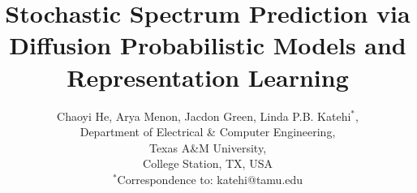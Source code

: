 \documentclass[lettersize,journal]{IEEEtran}
\begin{document}
\title{Stochastic Spectrum Prediction via Diffusion Probabilistic Models and Representation Learning}

\author{Chaoyi He, Arya Menon, Jacdon Green, Linda P.B. Katehi$^*$,
\\ Department of Electrical \& Computer Engineering, 
\\ Texas A\&M University, 
\\ College Station, TX, USA
\\ $^*$Correspondence to: katehi@tamu.edu
        
}



\maketitle
\end{document}
